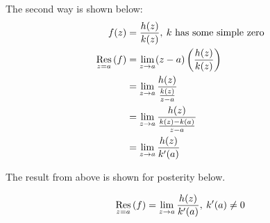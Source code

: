 The second way is shown below:
\begin{align*}
  f(z) &= \frac{h(z)}{k(z)}, \: \text{$k$ has some simple zero} \\
  \Residue{f}{z=a} &= \lim\limits_{z \to a} (z-a) \left( \frac{h(z)}{k(z)} \right) \\
       &= \lim\limits_{z \to a} \frac{h(z)}{\frac{k(z)}{z-a}} \\
       &= \lim\limits_{z \to a} \frac{h(z)}{\frac{k(z) - k(a)}{z-a}} \\
       &= \lim\limits_{z \to a} \frac{h(z)}{k'(a)} \\
\end{align*}

The result from above is shown for posterity below.

\begin{equation}\label{eq:General_Residue}
  \Residue{f}{z=a} = \lim\limits_{z \to a} \frac{h(z)}{k'(a)}, \: k'(a) \neq 0
\end{equation}

